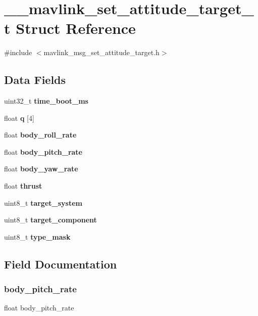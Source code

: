 \section{\+\_\+\+\_\+mavlink\+\_\+set\+\_\+attitude\+\_\+target\+\_\+t Struct Reference}
\label{struct____mavlink__set__attitude__target__t}


{\ttfamily \#include $<$mavlink\+\_\+msg\+\_\+set\+\_\+attitude\+\_\+target.\+h$>$}

\subsection*{Data Fields}
\begin{DoxyCompactItemize}
\item 
uint32\+\_\+t \textbf{ time\+\_\+boot\+\_\+ms}
\item 
float \textbf{ q} [4]
\item 
float \textbf{ body\+\_\+roll\+\_\+rate}
\item 
float \textbf{ body\+\_\+pitch\+\_\+rate}
\item 
float \textbf{ body\+\_\+yaw\+\_\+rate}
\item 
float \textbf{ thrust}
\item 
uint8\+\_\+t \textbf{ target\+\_\+system}
\item 
uint8\+\_\+t \textbf{ target\+\_\+component}
\item 
uint8\+\_\+t \textbf{ type\+\_\+mask}
\end{DoxyCompactItemize}


\subsection{Field Documentation}
\mbox{\label{struct____mavlink__set__attitude__target__t_a26579058cd88ca26b1ce0a7ecac26533}} 
\subsubsection{body\+\_\+pitch\+\_\+rate}
{\footnotesize\ttfamily float body\+\_\+pitch\+\_\+rate}

